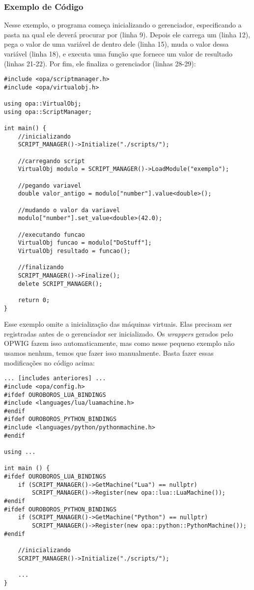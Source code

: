 \subsubsection{Exemplo de Código} 
Nesse exemplo, o programa começa inicializando o gerenciador, especificando a pasta na qual
ele deverá procurar por  (linha 9). Depois ele carrega um \script{} (linha 12),
pega o valor de uma variável de dentro dele (linha 15), muda o valor dessa variável (linha 18),
e executa uma função que fornece um valor de resultado (linhas 21-22). Por fim, ele finaliza o
gerenciador (linhas 28-29):
\vspace{1em}
\begin{lstlisting}
#include <opa/scriptmanager.h>
#include <opa/virtualobj.h>

using opa::VirtualObj;
using opa::ScriptManager;

int main() {
    //inicializando
    SCRIPT_MANAGER()->Initialize("./scripts/");
    
    //carregando script
    VirtualObj modulo = SCRIPT_MANAGER()->LoadModule("exemplo");
    
    //pegando variavel
    double valor_antigo = modulo["number"].value<double>();
    
    //mudando o valor da variavel
    modulo["number"].set_value<double>(42.0);
    
    //executando funcao
    VirtualObj funcao = modulo["DoStuff"];
    VirtualObj resultado = funcao(); 
    
    //finalizando
    SCRIPT_MANAGER()->Finalize();
    delete SCRIPT_MANAGER();
    
    return 0;
}
\end{lstlisting}
\vspace{1em}

Esse exemplo omite a inicialização das máquinas virtuais. Elas precisam ser registradas antes
de o gerenciador ser inicializado. Os \textit{wrappers} gerados pelo OPWIG fazem isso automaticamente,
mas como nesse pequeno exemplo não usamos nenhum, temos que fazer isso manualmente. Basta fazer essas
modificações no código acima:

\vspace{1em}
\begin{lstlisting}
... [includes anteriores] ...
#include <opa/config.h>
#ifdef OUROBOROS_LUA_BINDINGS
#include <languages/lua/luamachine.h>
#endif
#ifdef OUROBOROS_PYTHON_BINDINGS
#include <languages/python/pythonmachine.h>
#endif

using ...

int main () {
#ifdef OUROBOROS_LUA_BINDINGS
    if (SCRIPT_MANAGER()->GetMachine("Lua") == nullptr)
        SCRIPT_MANAGER()->Register(new opa::lua::LuaMachine());    
#endif
#ifdef OUROBOROS_PYTHON_BINDINGS
    if (SCRIPT_MANAGER()->GetMachine("Python") == nullptr)
        SCRIPT_MANAGER()->Register(new opa::python::PythonMachine());
#endif

    //inicializando
    SCRIPT_MANAGER()->Initialize("./scripts/");
    
    ...
}
\end{lstlisting}
\vspace{1em}

